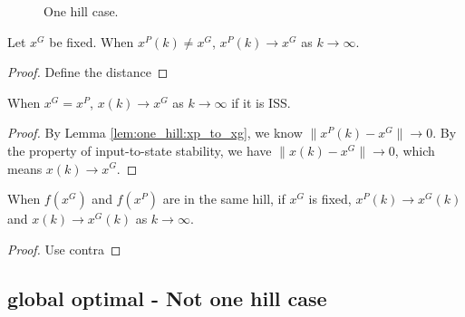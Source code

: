 \begin{figure}
\centering
{}
\caption{One hill case.}
\label{fig:one_hill_case}
\end{figure}

\begin{lemma}
\label{lem:one_hill:xp_to_xg}
Let $ x^{G} $ be fixed. 
When $ x^{P}(k) \neq x^{G} $, $ x^{P}(k) \rightarrow x^{G} $ as $ k \rightarrow \infty $.
\begin{proof}
Define the distance 
\end{proof}
\end{lemma}

\begin{lemma}
When $  x^{G} = x^{P} $, $ x(k) \rightarrow x^{G} $ as $ k \rightarrow \infty $ if it is ISS.
\begin{proof}
By Lemma \ref{lem:one_hill:xp_to_xg}, we know $ \lVert x^{P}(k) - x^{G} \rVert \rightarrow 0 $.
By the property of input-to-state stability, we have $ \lVert x(k) - x^{G} \rVert \rightarrow 0 $, which means
$ x(k) \rightarrow x^{G} $.
\end{proof}
\end{lemma}

\begin{theorem}
When $ f(x^{G}) $ and $ f(x^{P}) $ are in the same hill, if $ x^{G} $ is fixed, $ x^{P}(k) \rightarrow x^{G}(k) $ and $ x(k) \rightarrow x^{G}(k) $ as $ k \rightarrow \infty $.
\begin{proof}
Use contra
\end{proof}
\end{theorem}


\subsection{global optimal - Not one hill case}

